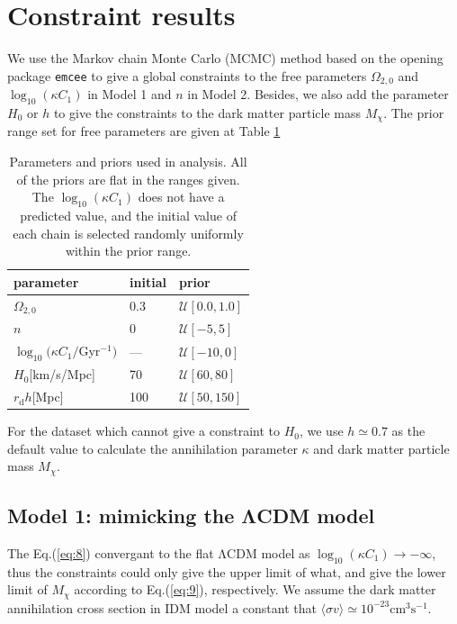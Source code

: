 \documentclass[twocolumn]{aastex631}
\begin{document}
\section{Constraint results}\label{sec:4}

   We use the Markov chain Monte Carlo (MCMC) method based 
   on the opening package \texttt{emcee} to give a global constraints
   to the free parameters $\Omega_{2,0}$ and $\log_{10}(\kappa C_1)$ in 
   Model 1 and $n$ in Model 2.
   Besides, we also add the parameter $H_0$ or $h$ to give the constraints
   to the dark matter particle mass $M_{\chi}$.
   The prior range set for free parameters are given at Table \ref{tab:3}

   \begin{table}
      \centering
      \begin{tabular}{lll}
         \hline\hline
         parameter & initial & prior \\
         \hline
         $\Omega_{2,0}$ & 0.3 & $\mathcal{U}[0.0,1.0]$ \\
         $n$ & 0 & $\mathcal{U}[-5,5]$ \\
         $\log_{10}(\kappa C_1/$Gyr${}^{-1})$ & --- & $\mathcal{U}[-10,0]$ \\
         $H_0$[km/s/Mpc] & 70 & $\mathcal{U}[60,80]$ \\
         \hline
         $r_{\text{d}}h$[Mpc] & 100 & $\mathcal{U}[50,150]$ \\
         \hline
      \end{tabular}
      \caption{Parameters and priors used in analysis. 
      All of the priors are flat in the ranges given. 
      The $\log_{10}(\kappa C_1)$ does not have a predicted value, 
      and the initial value of each chain is selected randomly uniformly
      within the prior range.}
      \label{tab:3}
   \end{table}

   For the dataset which cannot give a constraint to $H_0$, 
   we use $h \simeq 0.7$ as the default value to calculate the 
   annihilation parameter $\kappa$ and dark matter particle mass $M_{\chi}$.

\subsection{Model 1: mimicking the ΛCDM model}

   The Eq.(\ref{eq:8}) convergant to the flat ΛCDM model as
   $\log_{10}(\kappa C_1)\to-\infty$, thus the constraints
   could only give the upper limit of what, and give the lower limit
   of $M_{\chi}$ according to Eq.(\ref{eq:9}), respectively. We 
   assume the dark matter annihilation cross section in IDM model
   a constant that $\langle\sigma v\rangle \simeq 10^{-23}\text{cm}^{3}\text{s}^{-1}$.
\end{document}
